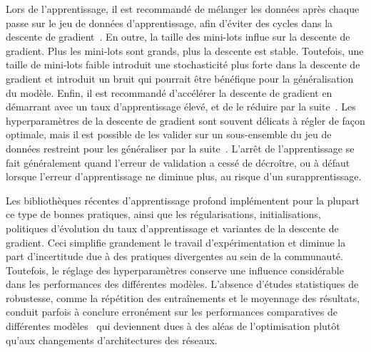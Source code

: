 Lors de l'apprentissage, il est recommandé de mélanger les données après chaque passe sur le jeu de données d'apprentissage, afin d'éviter des cycles dans la descente de gradient~\cite{lecun_efficient_1998}. En outre, la taille des mini-lots influe sur la descente de gradient. Plus les mini-lots sont grands, plus la descente est stable. Toutefois, une taille de mini-lots faible introduit une stochasticité plus forte dans la descente de gradient et introduit un bruit qui pourrait être bénéfique pour la généralisation du modèle. Enfin, il est recommandé d'accélérer la descente de gradient en démarrant avec un taux d'apprentissage élevé, et de le réduire par la suite~\cite{bengio_practical_2012}. Les hyperparamètres de la descente de gradient sont souvent délicats à régler de façon optimale, mais il est possible de les valider sur un sous-ensemble du jeu de données restreint pour les généraliser par la suite~\cite{bottou_stochastic_2012}. L'arrêt de l'apprentissage se fait généralement quand l'erreur de validation a cessé de décroître, ou à défaut lorsque l'erreur d'apprentissage ne diminue plus, au risque d'un surapprentissage.

Les bibliothèques récentes d'apprentissage profond implémentent pour la plupart ce type de bonnes pratiques, ainsi que les régularisations, initialisations, politiques d'évolution du taux d'apprentissage et variantes de la descente de gradient. Ceci simplifie grandement le travail d'expérimentation et diminue la part d'incertitude due à des pratiques divergentes au sein de la communauté. Toutefois, le réglage des hyperparamètres conserve une influence considérable dans les performances des différentes modèles. L'absence d'études statistiques de robustesse, comme la répétition des entraînements et le moyennage des résultats, conduit parfois à conclure erronément sur les performances comparatives de différentes modèles~\cite{oliver_realistic_2018} qui deviennent dues à des aléas de l'optimisation plutôt qu'aux changements d'architectures des réseaux.


